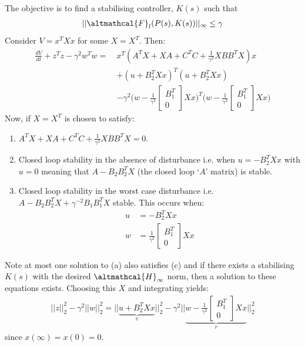 \documentclass[a4paper]{book}
\newcommand{\ix}[1]{%
  \leavevmode %
  \marginpar{\small\emph{#1}}%
}
\begin{document}
\ix{Objective}The objective is to find a stabilising controller, $K(s)$ such that 
\begin{align}
||\altmathcal{F}_l(P(s), K(s))||_\infty \leq \gamma
\end{align}
Consider $V = x^TX x$ for some $X=X^T$. Then:
\begin{align}
\frac{dV}{dt} + z^T z - \gamma^2 w^T w  =\ \nonumber &x^T (A^TX + XA + C^TC + \frac{1}{\gamma^2}  XBB^TX)x \nonumber \\
&+ (u + B_2^TXx)^T (u + B_2^TXx)  \nonumber\\ 
&-\gamma^2\Bigg( w - \frac{1}{\gamma^2} \begin{bmatrix}
B_1^T \\ 0
\end{bmatrix}Xx \Bigg)^T\Bigg( w - \frac{1}{\gamma^2} \begin{bmatrix}
B_1^T \\ 0
\end{bmatrix}Xx \Bigg)
\end{align}
\ix{Choosing $X$}Now, if $X=X^T$ is chosen to satisfy:
\begin{enumerate}[label=(\alph*): ]
	\item $A^TX + XA + C^TC + \frac{1}{\gamma^2}  XBB^TX = 0$.
	\item Closed loop stability in the absence of disturbance i.e. when $u = -B_2^TXx$ with $u=0$ meaning that $A - B_2B_2^T X$ (the closed loop `$A$' matrix) is stable.
	\item Closed loop stability in the worst case disturbance i.e. $A - B_2B_2^T X + \gamma^{-2} B_1B_1^T X$ stable. This occurs when:
	\begin{align}
	u &= -B_2^T Xx \nonumber \\
	w &= \frac{1}{\gamma^2} \begin{bmatrix}
	B_1^T \\ 0
	\end{bmatrix}Xx \nonumber
	\end{align}
\end{enumerate}
Note at most one solution to (a) also satisfies (c) and if there exists a stabilising $K(s)$ with the desired $\altmathcal{H}_\infty$ norm, then a solution to these equations exists. Choosing this $X$ and integrating yields:
\begin{align}
||z||_2^2 - \gamma^2 ||w||_2^2 = \Big|\Big| \underbrace{u + B_2^T Xx}_{v}\Big|\Big|_2^2 - \gamma^2 \Bigg|\Bigg| \underbrace{  w - \frac{1}{\gamma^2} \begin{bmatrix}
B_1^T \\ 0
\end{bmatrix}Xx}_{r} \Bigg|\Bigg|_2^2
\end{align}
since $x(\infty) = x(0) = 0$. 
\end{document}
